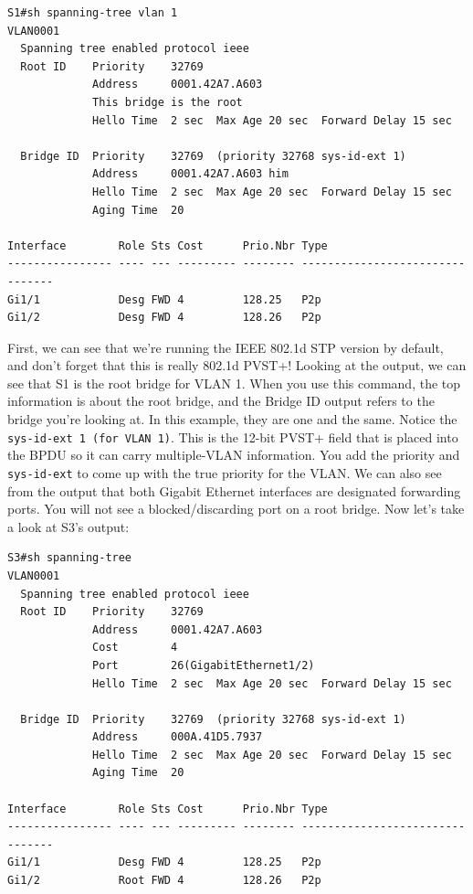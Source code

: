 \begin{verbatim}
S1#sh spanning-tree vlan 1
VLAN0001
  Spanning tree enabled protocol ieee
  Root ID    Priority    32769
             Address     0001.42A7.A603
             This bridge is the root
             Hello Time  2 sec  Max Age 20 sec  Forward Delay 15 sec
 
  Bridge ID  Priority    32769  (priority 32768 sys-id-ext 1)
             Address     0001.42A7.A603 him
             Hello Time  2 sec  Max Age 20 sec  Forward Delay 15 sec
             Aging Time  20
 
Interface        Role Sts Cost      Prio.Nbr Type
---------------- ---- --- --------- -------- --------------------------------
Gi1/1            Desg FWD 4         128.25   P2p
Gi1/2            Desg FWD 4         128.26   P2p
\end{verbatim}

First, we can see that we're running the IEEE 802.1d STP version by
default, and don't forget that this is really 802.1d PVST+! Looking at
the output, we can see that S1 is the root bridge for VLAN 1. When you
use this command, the top information is about the root bridge, and the
Bridge ID output refers to the bridge you're looking at. In this
example, they are one and the same. Notice the
\texttt{sys-id-ext\ 1\ (for\ VLAN\ 1)}. This is the 12-bit PVST+ field
that is placed into the BPDU so it can carry multiple-VLAN information.
You add the priority and \texttt{sys-id-ext} to come up with the true
priority for the VLAN. We can also see from the output that both Gigabit
Ethernet interfaces are designated forwarding ports. You will not see a
blocked/discarding port on a root bridge. Now let's take a look at S3's
output:

\begin{verbatim}
S3#sh spanning-tree
VLAN0001
  Spanning tree enabled protocol ieee
  Root ID    Priority    32769
             Address     0001.42A7.A603
             Cost        4
             Port        26(GigabitEthernet1/2)
             Hello Time  2 sec  Max Age 20 sec  Forward Delay 15 sec
 
  Bridge ID  Priority    32769  (priority 32768 sys-id-ext 1)
             Address     000A.41D5.7937
             Hello Time  2 sec  Max Age 20 sec  Forward Delay 15 sec
             Aging Time  20
 
Interface        Role Sts Cost      Prio.Nbr Type
---------------- ---- --- --------- -------- --------------------------------
Gi1/1            Desg FWD 4         128.25   P2p
Gi1/2            Root FWD 4         128.26   P2p
\end{verbatim}

